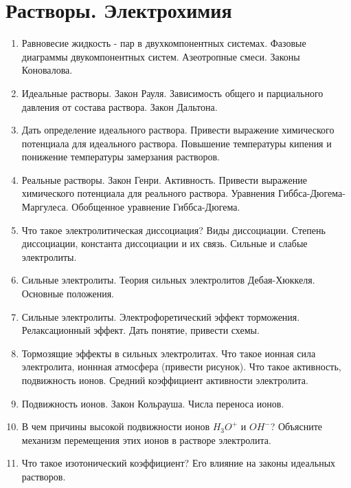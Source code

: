 %
\section{Растворы. Электрохимия}
\begin{enumerate}
\item 
Равновесие жидкость - пар в двухкомпонентных системах. Фазовые диаграммы двукомпонентных систем. Азеотропные смеси. Законы Коновалова.
\item
Идеальные растворы.  Закон Рауля. Зависимость общего и парциального давления от состава раствора. Закон Дальтона.

\item 
Дать определение идеального раствора. Привести выражение химического потенциала для идеального раствора. Повышение температуры кипения  и понижение температуры замерзания растворов.

\item
Реальные растворы.  Закон Генри. Активность. Привести выражение химического потенциала для реального раствора. Уравнения Гиббса-Дюгема-Маргулеса. Обобщенное уравнение Гиббса-Дюгема.

\item
Что такое электролитическая диссоциация? Виды диссоциации. Степень диссоциации, константа диссоциации и их связь.
Сильные и слабые электролиты.  
\item
Сильные  электролиты. Теория сильных электролитов Дебая-Хюккеля. Основные положения.  
\item
Сильные электролиты. Электрофоретический эффект торможения. Релаксационный эффект. Дать понятие, привести схемы.
 
\item
Тормозящие эффекты в сильных электролитах. Что такое ионная сила электролита, ионнная атмосфера (привести рисунок).  Что такое активность, подвижность ионов. Средний коэффициент активности электролита.
 
\item
Подвижность ионов. Закон Кольрауша. Числа переноса ионов.
 
\item
В чем причины высокой подвижности ионов $H_{3}O^{+}$ и $OH^{-}$? Объясните механизм перемещения этих ионов в растворе электролита.
 
\item
Что такое изотонический коэффициент? Его влияние на законы идеальных растворов.
 

\end{enumerate}
